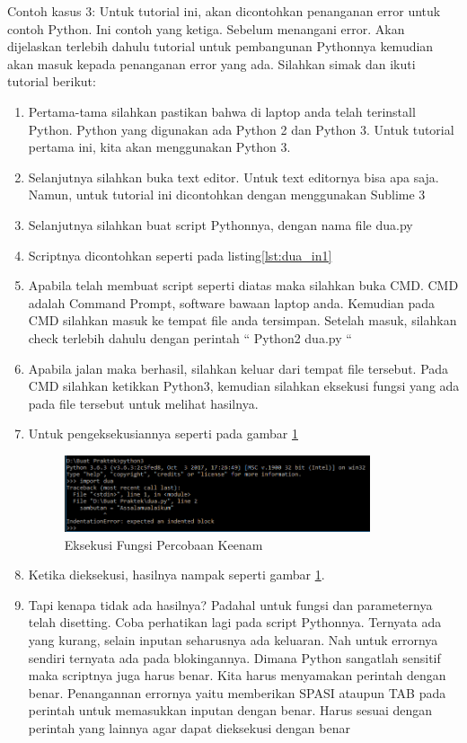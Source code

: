 Contoh kasus 3: Untuk tutorial ini, akan dicontohkan penanganan error untuk contoh Python. Ini contoh yang ketiga. Sebelum menangani error. Akan dijelaskan terlebih dahulu tutorial untuk pembangunan Pythonnya kemudian akan masuk kepada penanganan error yang ada. Silahkan simak dan ikuti tutorial berikut: 
\begin{enumerate}
\item Pertama-tama silahkan pastikan bahwa di laptop anda telah terinstall Python. Python yang digunakan ada Python 2 dan Python 3. Untuk tutorial pertama ini, kita akan menggunakan Python 3.
\item Selanjutnya silahkan buka text editor. Untuk text editornya bisa apa saja. Namun, untuk tutorial ini dicontohkan dengan menggunakan Sublime 3
\item Selanjutnya silahkan buat script Pythonnya, dengan nama file dua.py
\item Scriptnya dicontohkan seperti pada listing\ref{lst:dua_in1}

\item Apabila telah membuat script seperti diatas maka silahkan buka CMD. CMD adalah Command Prompt, software bawaan laptop anda. Kemudian pada CMD silahkan masuk ke tempat file anda tersimpan. Setelah masuk, silahkan check terlebih dahulu dengan perintah “ Python2 dua.py “
\item Apabila jalan maka berhasil, silahkan keluar dari tempat file tersebut. Pada CMD silahkan ketikkan Python3, kemudian silahkan eksekusi fungsi yang ada pada file tersebut untuk melihat hasilnya.
\item Untuk pengeksekusiannya seperti pada gambar \ref{fig:eksekusi_fungsi6}
\begin{figure}[!htbp]
	\centerline{\includegraphics[width=0.85\textwidth]{figures/8/eksekusi_fungsi6.png}}
	\caption{Eksekusi Fungsi Percobaan Keenam}
	\label{fig:eksekusi_fungsi6}
\end{figure}
\item Ketika dieksekusi, hasilnya nampak seperti gambar \ref{fig:eksekusi_fungsi6}.
\item Tapi kenapa tidak ada hasilnya? Padahal untuk fungsi dan parameternya telah disetting. Coba perhatikan lagi pada script Pythonnya. Ternyata ada yang kurang, selain inputan seharusnya ada keluaran. Nah untuk errornya sendiri ternyata ada pada blokingannya. Dimana Python sangatlah sensitif maka scriptnya juga harus benar. Kita harus menyamakan perintah dengan benar. Penangannan errornya yaitu memberikan SPASI ataupun TAB pada perintah untuk memasukkan inputan dengan benar. Harus sesuai dengan perintah yang lainnya agar dapat dieksekusi dengan benar

\end{enumerate}
